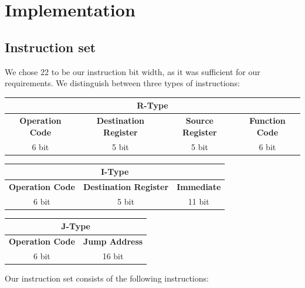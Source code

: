 \section{Implementation}

\subsection{Instruction set}

We chose 22 to be our instruction bit width, as it was sufficient for our requirements. We distinguish between three types of instructions:

\begin{center}
	\begin{tabular}{ | c | c | c | c | }
		\multicolumn{4}{c}{\textbf{R-Type}} \\
		\hline
		\textbf{Operation Code} & \textbf{Destination Register} & \textbf{Source Register} & \textbf{Function Code} \\
		\hline
		6 bit & 5 bit & 5 bit & 6 bit \\
		\hline
	\end{tabular} 
\end{center}

\begin{center}
	\begin{tabular}{ | c | c | c | }
		\multicolumn{3}{c}{\textbf{I-Type}} \\
		\hline
		\textbf{Operation Code} & \textbf{Destination Register} & \textbf{Immediate} \\
		\hline
		6 bit & 5 bit & 11 bit \\
		\hline
	\end{tabular} 
\end{center}

\begin{center}
	\begin{tabular}{ | c | c | }
		\multicolumn{2}{c}{\textbf{J-Type}} \\
		\hline
		\textbf{Operation Code} & \textbf{Jump Address} \\
		\hline
		6 bit & 16 bit \\
		\hline
	\end{tabular} 
\end{center}

Our instruction set consists of the following instructions: 

